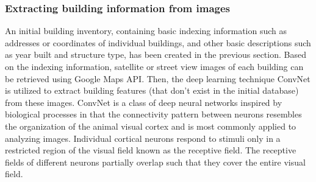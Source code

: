 \documentclass[letterpaper,10pt,english]{sphinxmanual}
\begin{document}
\subsubsection{Extracting building information from images}
\label{\detokenize{common/technical_manual/framework:extracting-building-information-from-images}}
\sphinxAtStartPar
An initial building inventory, containing basic indexing information such as addresses or coordinates of individual buildings,
and other basic descriptions such as year built and structure type, has been created in the previous section.
Based on the indexing information, satellite or street view images of each building can be retrieved using Google Maps API.
Then, the deep learning technique ConvNet is utilized to extract building features
(that don’t exist in the initial database) from these images.
ConvNet is a class of deep neural networks inspired by biological processes in that the connectivity pattern
between neurons resembles the organization of the animal visual cortex  and
is most commonly applied to analyzing images.
Individual cortical neurons respond to stimuli only in a restricted region of the visual field known as the receptive field.
The receptive fields of different neurons partially overlap such that they cover the entire visual field.
\end{document}

